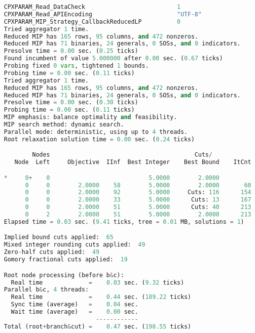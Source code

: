 \begin{lstlisting}[language=Python]
CPXPARAM_Read_DataCheck                          1
CPXPARAM_Read_APIEncoding                        "UTF-8"
CPXPARAM_MIP_Strategy_CallbackReducedLP          0
Tried aggregator 1 time.
Reduced MIP has 165 rows, 95 columns, and 472 nonzeros.
Reduced MIP has 71 binaries, 24 generals, 0 SOSs, and 0 indicators.
Presolve time = 0.00 sec. (0.25 ticks)
Found incumbent of value 5.000000 after 0.00 sec. (0.67 ticks)
Probing fixed 0 vars, tightened 1 bounds.
Probing time = 0.00 sec. (0.11 ticks)
Tried aggregator 1 time.
Reduced MIP has 165 rows, 95 columns, and 472 nonzeros.
Reduced MIP has 71 binaries, 24 generals, 0 SOSs, and 0 indicators.
Presolve time = 0.00 sec. (0.30 ticks)
Probing time = 0.00 sec. (0.11 ticks)
MIP emphasis: balance optimality and feasibility.
MIP search method: dynamic search.
Parallel mode: deterministic, using up to 4 threads.
Root relaxation solution time = 0.00 sec. (0.24 ticks)

        Nodes                                         Cuts/
   Node  Left     Objective  IInf  Best Integer    Best Bound    ItCnt     Gap

*     0+    0                            5.0000        2.0000            60.00%
      0     0        2.0000    58        5.0000        2.0000       60   60.00%
      0     0        2.0000    92        5.0000     Cuts: 116      154   60.00%
      0     0        2.0000    33        5.0000      Cuts: 13      167   60.00%
      0     0        2.0000    51        5.0000      Cuts: 40      213   60.00%
      0     2        2.0000    51        5.0000        2.0000      213   60.00%
Elapsed time = 0.03 sec. (9.41 ticks, tree = 0.01 MB, solutions = 1)

Implied bound cuts applied:  65
Mixed integer rounding cuts applied:  49
Zero-half cuts applied:  49
Gomory fractional cuts applied:  19

Root node processing (before b&c):
  Real time             =    0.03 sec. (9.32 ticks)
Parallel b&c, 4 threads:
  Real time             =    0.44 sec. (189.22 ticks)
  Sync time (average)   =    0.04 sec.
  Wait time (average)   =    0.00 sec.
                          ------------
Total (root+branch&cut) =    0.47 sec. (198.55 ticks)

\end{lstlisting}